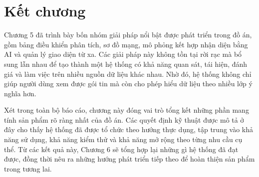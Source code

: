 \documentclass[../DoAn.tex]{subfiles}
\begin{document}
\section{Kết chương}
Chương 5 đã trình bày bốn nhóm giải pháp nổi bật được phát triển trong đồ án, gồm bảng điều khiển phân tích, sơ đồ mạng, mô phỏng kết hợp nhận diện bằng AI và quản lý giao diện từ xa. Các giải pháp này không tồn tại rời rạc mà bổ sung lẫn nhau để tạo thành một hệ thống có khả năng quan sát, tái hiện, đánh giá và làm việc trên nhiều nguồn dữ liệu khác nhau. Nhờ đó, hệ thống không chỉ giúp người dùng xem được gói tin mà còn cho phép hiểu dữ liệu theo nhiều lớp ý nghĩa hơn.

Xét trong toàn bộ báo cáo, chương này đóng vai trò tổng kết những phần mang tính sản phẩm rõ ràng nhất của đồ án. Các quyết định kỹ thuật được mô tả ở đây cho thấy hệ thống đã được tổ chức theo hướng thực dụng, tập trung vào khả năng sử dụng, khả năng kiểm thử và khả năng mở rộng theo từng nhu cầu cụ thể. Từ các kết quả này, Chương 6 sẽ tổng hợp lại những gì hệ thống đã đạt được, đồng thời nêu ra những hướng phát triển tiếp theo để hoàn thiện sản phẩm trong tương lai.
\end{document}
